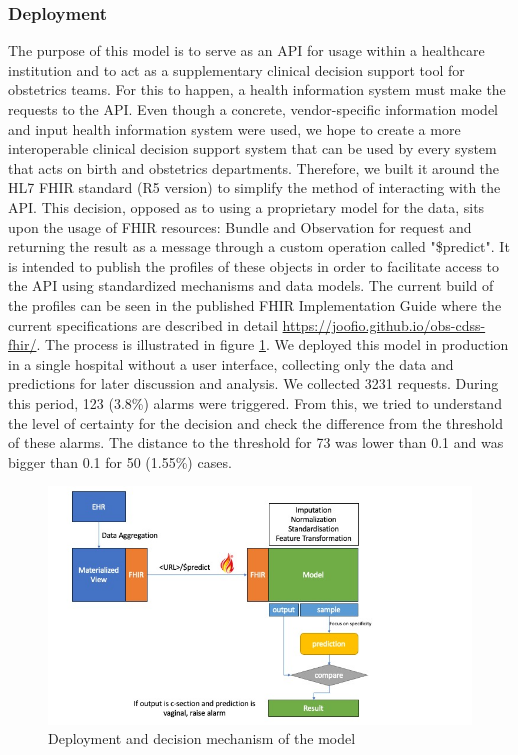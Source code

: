 \subsubsection{Deployment}
The purpose of this model is to serve as an API for usage within a healthcare institution and to act as a supplementary clinical decision support tool for obstetrics teams. For this to happen, a health information system must make the requests to the API. Even though a concrete, vendor-specific information model and input health information system were used, we hope to create a more interoperable clinical decision support system that can be used by every system that acts on birth and obstetrics departments. Therefore, we built it around the HL7 FHIR standard (R5 version) to simplify the method of interacting with the API. This decision, opposed as to using a proprietary model for the data, sits upon the usage of FHIR resources: Bundle and Observation for request and returning the result as a message through a custom operation called "\$predict". It is intended to publish the profiles of these objects in order to facilitate access to the API using standardized mechanisms and data models. The current build of the profiles can be seen in the published FHIR Implementation Guide where the current specifications are described in detail \url{https://joofio.github.io/obs-cdss-fhir/}. The process is illustrated in figure \ref{fig:deploy}. We deployed this model in production in a single hospital without a user interface, collecting only the data and predictions for later discussion and analysis. We collected 3231 requests. During this period, 123 (3.8\%) alarms were triggered. From this, we tried to understand the level of certainty for the decision and check the difference from the threshold of these alarms. The distance to the threshold for 73 was lower than 0.1 and was bigger than 0.1 for 50 (1.55\%) cases.



\begin{figure}[htbp]
\centering
\captionsetup{justification=centering}
\caption{Deployment and decision mechanism of the model}\label{fig:deploy} 
\includegraphics[scale=0.60]{figures/obs-model.jpg}
\end{figure}

